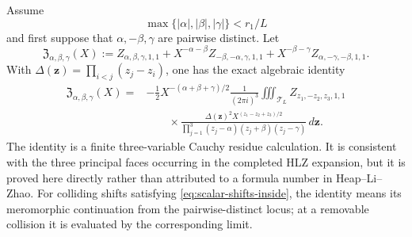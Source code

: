 \begin{proposition}
\label{prop:scalar-HLZ-three-face}
Assume
\begin{equation}
\max\{|\alpha|,|\beta|,|\gamma|\}<r_1/L
\label{eq:scalar-shifts-inside}
\end{equation}
and first suppose that $\alpha,-\beta,\gamma$ are pairwise distinct.
Let
\[
\mathfrak Z_{\alpha,\beta,\gamma}(X)
:=Z_{\alpha,\beta,\gamma,1,1}
+X^{-\alpha-\beta}Z_{-\beta,-\alpha,\gamma,1,1}
+X^{-\beta-\gamma}Z_{\alpha,-\gamma,-\beta,1,1}.
\]
With $\Delta(\mathbf z)=\prod_{i<j}(z_j-z_i)$, one has the exact algebraic
identity
\begin{equation}
\boxed{
\begin{aligned}
\mathfrak Z_{\alpha,\beta,\gamma}(X)
={}&-\frac12X^{-(\alpha+\beta+\gamma)/2}
\frac1{(2\pi i)^3}
\iiint_{\mathcal T_L}
Z_{z_1,-z_2,z_3,1,1}\\
&\qquad\times
\frac{\Delta(\mathbf z)^2X^{(z_1-z_2+z_3)/2}}
{\prod_{j=1}^3(z_j-\alpha)(z_j+\beta)(z_j-\gamma)}
\,d\mathbf z .
\end{aligned}}
\label{eq:scalar-HLZ-three-face}
\end{equation}
The identity is a finite three-variable Cauchy residue calculation.  It is
consistent with the three principal faces occurring in the completed HLZ
expansion, but it is proved here directly rather than attributed to a formula
number in Heap--Li--Zhao.
For colliding shifts satisfying \eqref{eq:scalar-shifts-inside}, the identity
means its meromorphic continuation from the pairwise-distinct locus; at a
removable collision it is evaluated by the corresponding limit.
\end{proposition}

